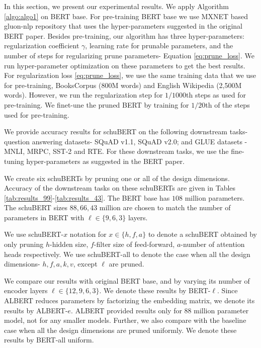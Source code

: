 \documentclass[11pt,a4paper]{article}
\begin{document}
In this section, we present our experimental results. We apply Algorithm \ref{algo:algo1} on BERT base. For pre-training BERT base we use MXNET based gluon-nlp repository that uses the hyper-parameters suggested in the original BERT paper. Besides pre-training, our algorithm has three hyper-parameters: regularization coefficient $\gamma$, learning rate for prunable parameters, and the number of steps for regularizing prune parameters- Equation \eqref{eq:prune_loss}. We run hyper-parameter optimization on these parameters to get the best results. For regularization loss \eqref{eq:prune_loss}, we use the same training data that we use for pre-training, BooksCorpus (800M words) and English Wikipedia (2,500M words). However, we run the regularization step for $1/1000$th steps as used for pre-training. We finet-une the pruned BERT by training for $1/20$th of the steps used for pre-training. 

We provide accuracy results for schuBERT on the following downstream tasks- question answering datasets- SQuAD v1.1, SQuAD v2.0; and GLUE datasets - MNLI, MRPC, SST-2 and RTE. For these downstream tasks, we use the fine-tuning hyper-parameters as suggested in the BERT paper. 

We create six schuBERTs by pruning one or all of the design dimensions. 
Accuracy of the downstream tasks on these schuBERTs are given in Tables \ref{tab:results_99}-\ref{tab:results_43}.
The BERT base has $108$ million parameters. The schuBERT sizes $88, 66, 43$ million are chosen to match the number of parameters in BERT with $\ell \in \{9, 6, 3\}$ layers. 

We use schuBERT-$x$ notation for $x \in \{h, f, a\}$ to denote a schuBERT obtained by only pruning $h$-hidden size, $f$-filter size of feed-forward, $a$-number of attention heads respectively. We use schuBERT-all to denote the case when all the design dimensions- $h, f, a, k, v$, except $\ell$ are pruned. 

We compare our results with original BERT base, and by varying its number of encoder layers $\ell \in \{12, 9, 6, 3\}$. We denote these results by BERT-$\ell$. Since ALBERT reduces parameters by factorizing the embedding matrix, we denote its results by ALBERT-$e$. ALBERT provided results only for $88$ million parameter model, not for any smaller models. 
Further, we also compare with the baseline case when all the design dimensions are pruned uniformly. We denote these results by BERT-all uniform. 
\end{document}
